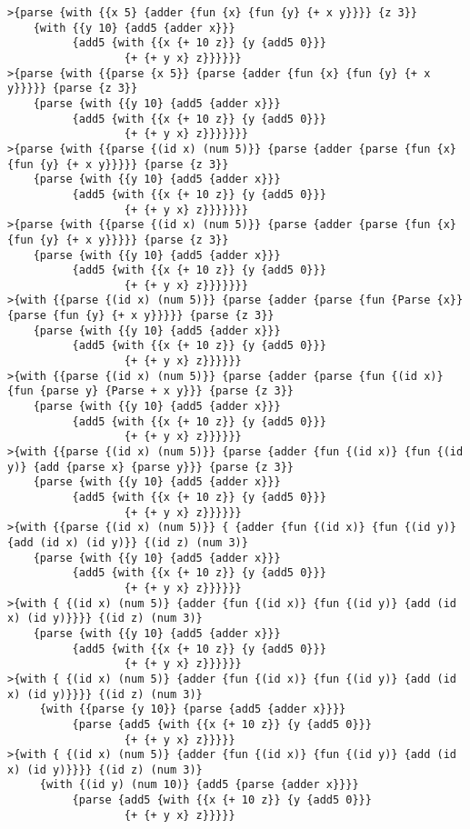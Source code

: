 \documentclass[letterpaper,11pt]{article}
\begin{document}
\begin{verbatim}
>{parse {with {{x 5} {adder {fun {x} {fun {y} {+ x y}}}} {z 3}}
    {with {{y 10} {add5 {adder x}}}
          {add5 {with {{x {+ 10 z}} {y {add5 0}}}
                  {+ {+ y x} z}}}}}}
>{parse {with {{parse {x 5}} {parse {adder {fun {x} {fun {y} {+ x y}}}}} {parse {z 3}}
    {parse {with {{y 10} {add5 {adder x}}}
          {add5 {with {{x {+ 10 z}} {y {add5 0}}}
                  {+ {+ y x} z}}}}}}}
>{parse {with {{parse {(id x) (num 5)}} {parse {adder {parse {fun {x} {fun {y} {+ x y}}}}} {parse {z 3}}
    {parse {with {{y 10} {add5 {adder x}}}
          {add5 {with {{x {+ 10 z}} {y {add5 0}}}
                  {+ {+ y x} z}}}}}}}
>{parse {with {{parse {(id x) (num 5)}} {parse {adder {parse {fun {x} {fun {y} {+ x y}}}}} {parse {z 3}}
    {parse {with {{y 10} {add5 {adder x}}}
          {add5 {with {{x {+ 10 z}} {y {add5 0}}}
                  {+ {+ y x} z}}}}}}}
>{with {{parse {(id x) (num 5)}} {parse {adder {parse {fun {Parse {x}} {parse {fun {y} {+ x y}}}}} {parse {z 3}}
    {parse {with {{y 10} {add5 {adder x}}}
          {add5 {with {{x {+ 10 z}} {y {add5 0}}}
                  {+ {+ y x} z}}}}}}
>{with {{parse {(id x) (num 5)}} {parse {adder {parse {fun {(id x)} {fun {parse y} {Parse + x y}}} {parse {z 3}}
    {parse {with {{y 10} {add5 {adder x}}}
          {add5 {with {{x {+ 10 z}} {y {add5 0}}}
                  {+ {+ y x} z}}}}}}
>{with {{parse {(id x) (num 5)}} {parse {adder {fun {(id x)} {fun {(id y)} {add {parse x} {parse y}}} {parse {z 3}}
    {parse {with {{y 10} {add5 {adder x}}}
          {add5 {with {{x {+ 10 z}} {y {add5 0}}}
                  {+ {+ y x} z}}}}}}
>{with {{parse {(id x) (num 5)}} { {adder {fun {(id x)} {fun {(id y)} {add (id x) (id y)}} {(id z) (num 3)}
    {parse {with {{y 10} {add5 {adder x}}}
          {add5 {with {{x {+ 10 z}} {y {add5 0}}}
                  {+ {+ y x} z}}}}}}
>{with { {(id x) (num 5)} {adder {fun {(id x)} {fun {(id y)} {add (id x) (id y)}}}} {(id z) (num 3)}
    {parse {with {{y 10} {add5 {adder x}}}
          {add5 {with {{x {+ 10 z}} {y {add5 0}}}
                  {+ {+ y x} z}}}}}}
>{with { {(id x) (num 5)} {adder {fun {(id x)} {fun {(id y)} {add (id x) (id y)}}}} {(id z) (num 3)}
     {with {{parse {y 10}} {parse {add5 {adder x}}}}
          {parse {add5 {with {{x {+ 10 z}} {y {add5 0}}}
                  {+ {+ y x} z}}}}}
>{with { {(id x) (num 5)} {adder {fun {(id x)} {fun {(id y)} {add (id x) (id y)}}}} {(id z) (num 3)}
     {with {(id y) (num 10)} {add5 {parse {adder x}}}}
          {parse {add5 {with {{x {+ 10 z}} {y {add5 0}}}
                  {+ {+ y x} z}}}}}

\end{verbatim}
\end{document}
